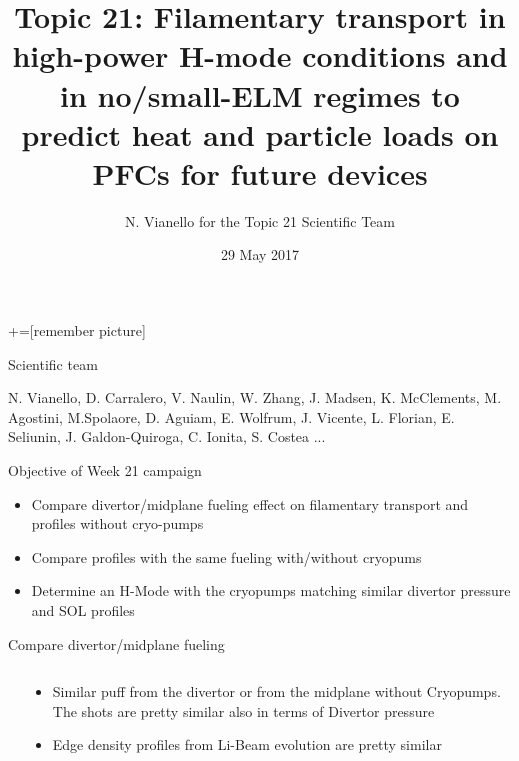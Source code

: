 \documentclass[10pt, compress]{beamer}
\title{{\small Topic 21: Filamentary transport in high-power H-mode conditions and in no/small-ELM regimes to predict heat and particle loads on PFCs for future devices }}
\date{29 May 2017}
\author[Topic 21 Scientific Team]{N. Vianello for the Topic 21 Scientific Team}
\newcommand\Fontvi{\fontsize{8}{7.2}\selectfont}
\begin{document}
+=[remember picture]
\maketitle
\begin{frame}{Scientific team}
  \begin{center}
N. Vianello, D. Carralero, V. Naulin, W. Zhang, J. Madsen, K. McClements,
M. Agostini, M.Spolaore, D. Aguiam, E. Wolfrum, J. Vicente,
L. Florian, E. Seliunin, J. Galdon-Quiroga, C. Ionita, S. Costea ...
  \end{center}
\end{frame}
\begin{frame}{Objective of Week 21 campaign}
  \begin{itemize}[<+-|alert@+>]
    \item Compare divertor/midplane fueling effect on filamentary
      transport and profiles without cryo-pumps
    \item Compare profiles with the same fueling with/without cryopums
    \item Determine an H-Mode with the cryopumps matching similar
      divertor pressure and SOL profiles
  \end{itemize}    
\end{frame}
\begin{frame}{Compare divertor/midplane fueling}
\Fontvi
  \vspace{-1cm}
\begin{columns}
  \begin{column}{0.65\textwidth}
  \end{column}
  \begin{column}{0.35\textwidth}
    \begin{itemize}
      \item Similar puff from the divertor or from the midplane
        without Cryopumps. The
        shots are pretty similar also in terms of Divertor pressure
      \item<2-> Edge density profiles from Li-Beam evolution are
        pretty similar
    \end{itemize}
  
  \end{column}
\end{columns}
\end{frame}
\end{document}
